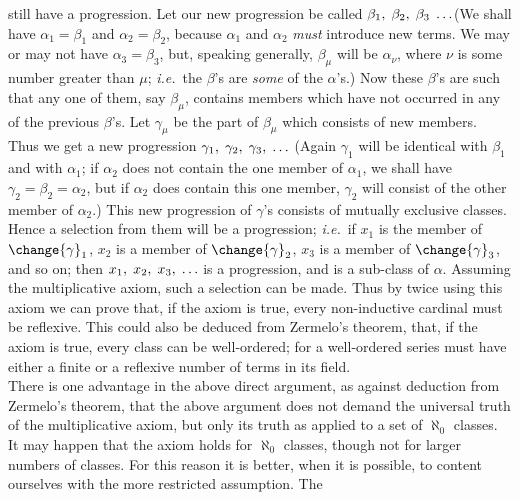 {still have a progression. Let our new progression be called 
$\beta_1,\thickspace \beta_2,\thickspace \beta_3 \thickspace\ldots$\kksentencespace (We
shall
have $\alpha_1 = \beta_1$ and $\alpha_2 = \beta_2$, because 
$\alpha_1$ and $\alpha_2$ \textit{must} introduce
new terms. We may or may not 
have $\alpha_3 = \beta_3$,
but, speaking generally, $\beta_\mu$ will be $\alpha_\nu$, where 
\ensuremath{\nu} is
some number greater than \ensuremath{\mu}; \textit{i.e.}\ the \ensuremath{\beta}'s are
\textit{some} of the \ensuremath{\alpha}'s.) Now these \ensuremath{\beta}'s are such that
any
one of them, say $\beta_\mu$, contains members which have not occurred in
any of the previous
\ensuremath{\beta}'s. Let $\gamma_\mu$ be the part of 
$\beta_\mu$
which consists of new members. Thus we
get a new progression $\gamma_1,\thickspace \gamma_2,\thickspace \gamma_3,\thickspace \ldots$\kksentencespace
(Again $\gamma_1$ will be
identical
with $\beta_1$ and with $\alpha_1$; if $\alpha_2$
does not contain the one member of $\alpha_1$, we
shall have $\gamma_2 = \beta_2 = \alpha_2$,
but if $\alpha_2$ does contain this one member, 
$\gamma_2$
will consist of the other member of 
$\alpha_2$.) This
new progression of \ensuremath{\gamma}'s
consists of mutually exclusive classes. Hence a selection from them
will be a progression; \textit{i.e.}\ if $x_1$ is the member of 
\label{change:ygammas}$\change{\gamma}_1$,
$x_2$ is a
member of $\change{\gamma}_2$, $x_3$
is a member of $\change{\gamma}_3$, and so
on; then $x_1,\thickspace x_2,\thickspace
x_3,\thickspace {\ldots}$
is a progression, and is a sub-class of \ensuremath{\alpha}. Assuming the
multiplicative axiom, such a selection can be made. Thus by twice using
this axiom we can prove that, if the axiom is true, every non-inductive
cardinal must be reflexive. This could also be deduced from Zermelo's
theorem, that, if the axiom is true, every class can be \label{change:wellordered}well-ordered;
for a well-ordered series must have either a finite or a reflexive
number of terms in its field.\\
\indent There is one advantage in the above
direct argument, as
against
deduction from Zermelo's theorem, that the above argument does not
demand the universal truth of the multiplicative axiom, but only its
truth as applied to a set of $\aleph_0$ classes. It may
happen that the axiom holds for $\aleph_0$
classes, though not
for larger
numbers of classes. For this reason it is better, 
when   it is possible,
to content ourselves with the more restricted assumption. The
}
